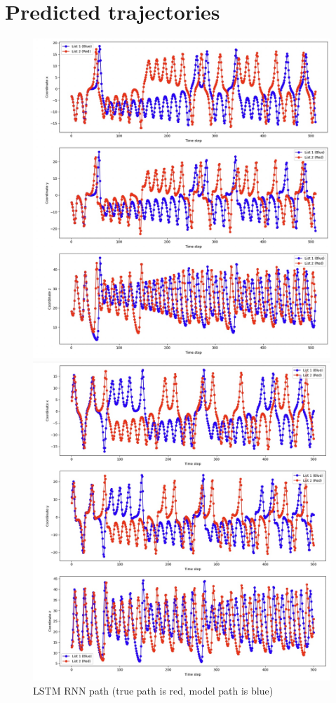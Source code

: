 \documentclass[11pt]{article}
\begin{document}
\section{Predicted trajectories}
\begin{figure}
    \centering
    \begin{minipage}[b]{0.49\textwidth}
        \includegraphics[width=\linewidth]{rnn_path.jpeg}
        \caption{LSTM RNN path (true path is red, model path is blue)}
        \label{fig:rnn_path}
    \end{minipage}
    \hfill
    \begin{minipage}[b]{0.49\textwidth}
        \includegraphics[width=\linewidth]{echo_path.jpeg}

\end{minipage}
\end{figure}
\end{document}
